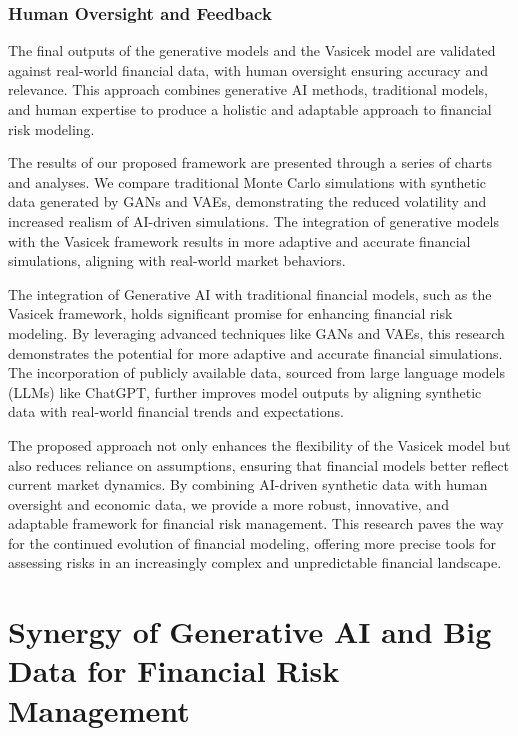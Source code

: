 \documentclass[a4paper,headinclude=on,footinclude=on,12pt,oneside]{scrbook}
\begin{document}
	\subsection{Human Oversight and Feedback}
	
	The final outputs of the generative models and the Vasicek model are validated against real-world financial data, with human oversight ensuring accuracy and relevance. This approach combines generative AI methods, traditional models, and human expertise to produce a holistic and adaptable approach to financial risk modeling.
	
	
	The results of our proposed framework are presented through a series of charts and analyses. We compare traditional Monte Carlo simulations with synthetic data generated by GANs and VAEs, demonstrating the reduced volatility and increased realism of AI-driven simulations. The integration of generative models with the Vasicek framework results in more adaptive and accurate financial simulations, aligning with real-world market behaviors.
	
	
	The integration of Generative AI with traditional financial models, such as the Vasicek framework, holds significant promise for enhancing financial risk modeling. By leveraging advanced techniques like GANs and VAEs, this research demonstrates the potential for more adaptive and accurate financial simulations. The incorporation of publicly available data, sourced from large language models (LLMs) like ChatGPT, further improves model outputs by aligning synthetic data with real-world financial trends and expectations.
	
	The proposed approach not only enhances the flexibility of the Vasicek model but also reduces reliance on assumptions, ensuring that financial models better reflect current market dynamics. By combining AI-driven synthetic data with human oversight and economic data, we provide a more robust, innovative, and adaptable framework for financial risk management. This research paves the way for the continued evolution of financial modeling, offering more precise tools for assessing risks in an increasingly complex and unpredictable financial landscape.
	
	
	\chapter{Synergy of Generative AI and Big Data for Financial Risk Management}
	
\end{document}
